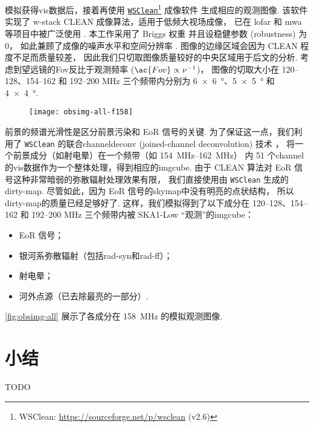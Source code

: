 模拟获得\ac{vis}数据后，接着再使用
\href{https://sourceforge.net/p/wsclean}{\texttt{WSClean}}\footnote{%
  WSClean: \url{https://sourceforge.net/p/wsclean} (v2.6)}
成像软件\cite{offringa2014}
生成相应的观测图像.
该软件实现了 \ac{w-stack} CLEAN 成像算法，适用于低频大视场成像，
已在 \ac{lofar} 和 \ac{mwa} 等项目中被广泛使用 \cite{offringa2014,offringa2017}.
本工作采用了 Briggs 权重\cite{briggs1995}
并且设稳健参数 (robustness) 为 0，
如此兼顾了成像的噪声水平和空间分辨率 \cite{briggs1995}.
图像的边缘区域会因为 CLEAN 程度不足而质量较差，
因此我们只切取图像质量较好的中央区域用于后文的分析.
考虑到望远镜的\acl{Fov}反比于观测频率 ($\ac{Fov} \propto \nu^{-1}$)，
图像的切取大小在 \numrange{120}{128}、\numrange{154}{162} 和
\numrange{192}{200} \si{\MHz} 三个频带内分别为
\SI{6 x 6}{\degree}、\SI{5 x 5}{\degree} 和 \SI{4 x 4}{\degree}.

\begin{figure}[htp]
  \centering
  \texttt{[image: obsimg-all-f158]}
  \label{fig:obsimg-all}
\end{figure}

前景的频谱光滑性是区分前景污染和 EoR 信号的关键.
为了保证这一点，我们利用了 \texttt{WSClean} 的联合\ac{channel}\ac{deconv}
(joined-channel deconvolution) 技术 \cite{offringa2017}，
将一个前景成分（如射电晕）在一个频带（如 \SIrange{154}{162}{\MHz}）
内 51 个\ac{channel}的\ac{vis}数据作为一个整体处理，得到相应的\ac{imgcube}.
由于 CLEAN 算法对 EoR 信号这种非常暗弱的弥散辐射处理效果有限，
我们直接使用由 \texttt{WSClean} 生成的\ac{dirty-map}.
尽管如此，因为 EoR 信号的\ac{skymap}中没有明亮的点状结构，
所以\ac{dirty-map}的质量已经足够好了.
这样，我们模拟得到了以下成分在 \numrange{120}{128}、\numrange{154}{162}
和 \numrange{192}{200} \si{\MHz} 三个频带内被
SKA1-Low \enquote{观测}的\ac{imgcube}：
\begin{itemize}
  \item EoR 信号；
  \item 银河系弥散辐射（包括\ac{rad-syn}和\ac{rad-ff}）；
  \item 射电晕；
  \item 河外点源（已去除最亮的一部分）.
\end{itemize}
\autoref{fig:obsimg-all} 展示了各成分在 \SI{158}{\MHz} 的模拟观测图像.


\section{小结}

TODO


